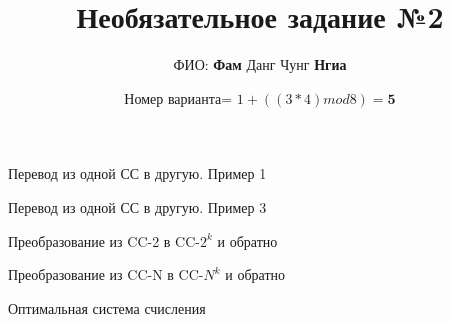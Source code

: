 \documentclass{beamer}
\title{\textbf{Необязательное задание №2}}
\author{ФИО: \textbf{Фам} Данг Чунг \textbf{Нгиа}}
\date{Номер варианта= $1+((3*4) mod 8)=\textbf{5}$}
\begin{document}
\frame{\titlepage}
\begin{frame}{Перевод из одной СС в другую. Пример 1}
    
\end{frame}


\begin{frame}{Перевод из одной СС в другую. Пример 3}
    
\end{frame}

\begin{frame}{Преобразование из CC-2 в CC-$2^{k}$ и обратно}
    
\end{frame}

\begin{frame}{Преобразование из CC-N в CC-$N^{k}$ и обратно}
    
\end{frame}

\begin{frame}{Оптимальная система счисления}
    
\end{frame}
\end{document}
